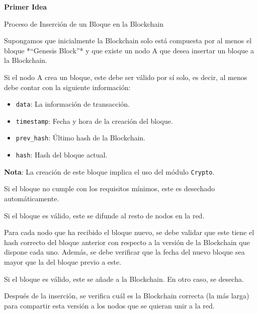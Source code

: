 
\vspace{1cm}
{\Huge{\textbf{Primer Idea}}} 
\vspace{1cm}

{\large{

    Proceso de Inserción de un Bloque en la Blockchain  \vspace{.3cm}

    Supongamos que inicialmente la Blockchain solo está compuesta por al menos el bloque *“Genesis Block”* y que existe un nodo A que desea insertar un bloque a la Blockchain.  \vspace{.3cm}

    Si el nodo A crea un bloque, este debe ser válido por sí solo, es decir, al menos debe contar con la siguiente información:

    \begin{itemize}
        \item \texttt{data}: La información de transacción.
        \item \texttt{timestamp}: Fecha y hora de la creación del bloque.
        \item \texttt{prev\_hash}: Último hash de la Blockchain.
        \item \texttt{hash}: Hash del bloque actual.  \vspace{.3cm}
    \end{itemize}

    \textbf{Nota}: La creación de este bloque implica el uso del módulo \texttt{Crypto}.  \vspace{.3cm}

    Si el bloque no cumple con los requisitos mínimos, este es desechado automáticamente.  \vspace{.3cm}

    Si el bloque es válido, este se difunde al resto de nodos en la red.  \vspace{.3cm}

    Para cada nodo que ha recibido el bloque nuevo, se debe validar que este tiene el hash correcto del bloque anterior con respecto a la versión de la Blockchain que dispone cada uno. Además, se debe verificar que la fecha del nuevo bloque sea mayor que la del bloque previo a este.  \vspace{.3cm}

    Si el bloque es válido, este se añade a la Blockchain. En otro caso, se desecha.  \vspace{.3cm}

    Después de la inserción, se verifica cuál es la Blockchain correcta (la más larga) para compartir esta versión a los nodos que se quieran unir a la red.  \vspace{.3cm}

}}

